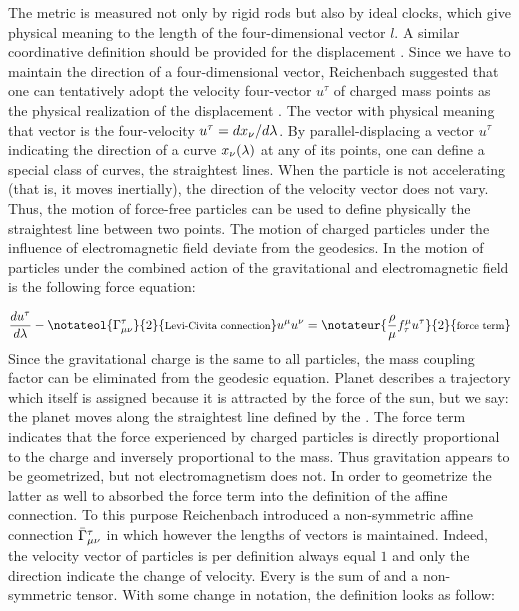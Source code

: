 \documentclass[draft]{article}
\newcommand{\ap}{\ensuremath{\lambda}\xspace}
\newcommand{\Gtmnbar}{\ensuremath{\bar{\Gamma}\tmn}\xspace}
\begin{document}
The metric \gmn is measured not only by rigid rods but also by ideal clocks, which give physical meaning to the length of the four-dimensional vector $l$. A similar coordinative definition should be provided for the displacement \Gtmn. Since we have to maintain the direction of a four-dimensional vector, Reichenbach suggested that one can tentatively adopt the velocity four-vector $u^\tau$ of charged mass points as the physical realization of the displacement \citep[]{Eddington1923}. The vector with  physical meaning that vector is the four-velocity $u^\tau=d\xn/d\ap$. By parallel-displacing a vector $u^\tau$ indicating the direction of a curve $\xn(\ap)$ at any of its points, one can define a special class of curves, the straightest lines.  When the particle is not accelerating (that is, it moves inertially), the direction of the velocity vector does not vary. Thus, the motion of force-free particles can be used to define physically the straightest line between two \spti points. The motion of charged particles under the influence of electromagnetic field deviate from the geodesics. In \gr the motion of particles under the combined action of the gravitational and electromagnetic field is the following force equation:

\begin{equation*}\label{eq:forceequation}
\frac{d {u^\tau}}{d\ap} - \notateol{\Gtmn}{2}{\texts{Levi-Civita connection}} u^{\mu} u^\nu = \notateur{\frac{\rho}{\mu} f_{\tau}^{\mu} u^\tau}{2}{\texts{force term}}
\end{equation*}
%
Since the gravitational charge is the same to all particles, the mass coupling factor can be eliminated from the geodesic equation. Planet describes a trajectory which itself is assigned because it is attracted by the force of the sun, but we say: the planet moves along the straightest line defined by the \Gtmn. The force term indicates that the force experienced by charged particles is directly proportional to the charge and inversely proportional to the mass. Thus gravitation appears to be geometrized, but not electromagnetism does not. In order to geometrize the latter as well to absorbed the force term into the definition of the affine connection. To this purpose Reichenbach introduced a non-symmetric affine connection \Gtmnbar in which however the lengths of vectors is maintained. Indeed, the velocity vector of particles is per definition always equal $1$ and only the direction indicate the change of velocity. Every is the sum of and a non-symmetric tensor. With some change in notation, the definition looks as follow:
\end{document}
